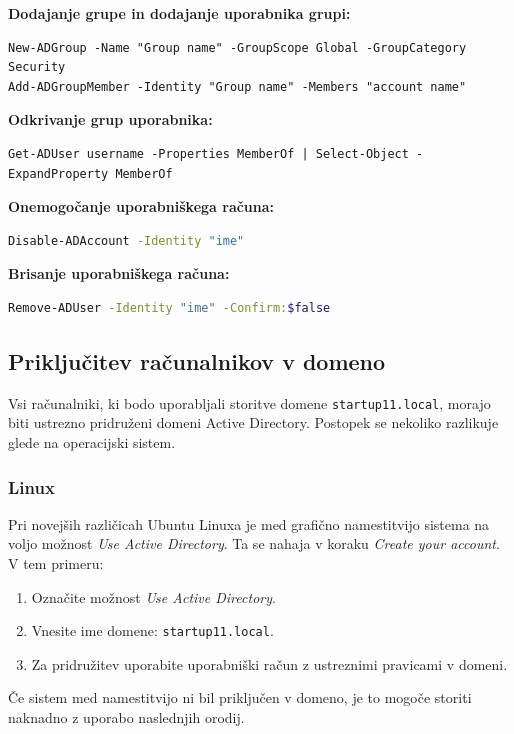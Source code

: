 \documentclass[a4paper,11pt]{article}
\begin{document}
\textbf{Dodajanje grupe in dodajanje uporabnika grupi:}
\begin{lstlisting}
New-ADGroup -Name "Group name" -GroupScope Global -GroupCategory Security
Add-ADGroupMember -Identity "Group name" -Members "account name"
\end{lstlisting}

\textbf{Odkrivanje grup uporabnika:}
\begin{lstlisting}
Get-ADUser username -Properties MemberOf | Select-Object -ExpandProperty MemberOf
\end{lstlisting} 


\textbf{Onemogočanje uporabniškega računa:}
\begin{lstlisting}[language=bash, breaklines=true]
Disable-ADAccount -Identity "ime"
\end{lstlisting}

\textbf{Brisanje uporabniškega računa:}
\begin{lstlisting}[language=bash, breaklines=true]
Remove-ADUser -Identity "ime" -Confirm:$false
\end{lstlisting}

\subsection{Priključitev računalnikov v domeno}

Vsi računalniki, ki bodo uporabljali storitve domene \texttt{startup11.local}, morajo biti ustrezno pridruženi domeni Active Directory. Postopek se nekoliko razlikuje glede na operacijski sistem.

\subsubsection{Linux}

Pri novejših različicah Ubuntu Linuxa je med grafično namestitvijo sistema na voljo možnost \textit{Use Active Directory}. Ta se nahaja v koraku \textit{Create your account}. V tem primeru:

\begin{enumerate}
    \item Označite možnost \textit{Use Active Directory}.
    \item Vnesite ime domene: \texttt{startup11.local}.
    \item Za pridružitev uporabite uporabniški račun z ustreznimi pravicami v domeni.
\end{enumerate}

Če sistem med namestitvijo ni bil priključen v domeno, je to mogoče storiti naknadno z uporabo naslednjih orodij.
\end{document}
